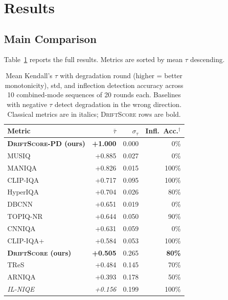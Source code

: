 \documentclass[sigconf]{acmart}
\newcommand{\DS}{\textsc{DriftScore}}
\begin{document}
\section{Results}
\label{sec:results}

\subsection{Main Comparison}

Table~\ref{tab:main} reports the full results.
Metrics are sorted by mean $\tau$ descending.

\begin{table}[t]
  \caption{Mean Kendall's $\tau$ with degradation round (higher =
    better monotonicity), std, and inflection detection accuracy across
    10 combined-mode sequences of 20 rounds each.
    Baselines with negative $\tau$ detect degradation in the wrong
    direction.
    Classical metrics are in italics; \DS{} rows are bold.}
  \label{tab:main}
  \small
  \begin{tabular}{lrrr}
    \toprule
    \textbf{Metric} & $\bar{\tau}$ & $\sigma_\tau$ & \textbf{Infl.\ Acc.}$^\dagger$ \\
    \midrule
    \textbf{\DS{}-PD (ours)}   & \textbf{+1.000} & 0.000 & 0\% \\
    MUSIQ                      & +0.885          & 0.027 & 0\% \\
    MANIQA                     & +0.826          & 0.015 & 100\% \\
    CLIP-IQA                   & +0.717          & 0.095 & 100\% \\
    HyperIQA                   & +0.704          & 0.026 & 80\% \\
    DBCNN                      & +0.651          & 0.019 & 0\% \\
    TOPIQ-NR                   & +0.644          & 0.050 & 90\% \\
    CNNIQA                     & +0.631          & 0.059 & 0\% \\
    CLIP-IQA+                  & +0.584          & 0.053 & 100\% \\
    \textbf{\DS{} (ours)}      & \textbf{+0.505} & 0.265 & \textbf{80\%} \\
    TReS                       & +0.484          & 0.145 & 70\% \\
    ARNIQA                     & +0.393          & 0.178 & 50\% \\
    \textit{IL-NIQE}           & \textit{+0.156} & 0.199 & 100\% \\

\end{tabular}
\end{table}
\end{document}
